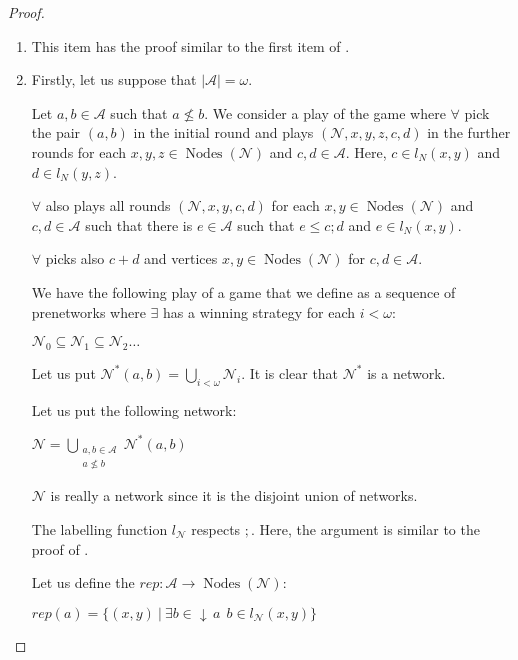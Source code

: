 \documentclass[a4paper]{article}
\theoremstyle{definition}
\theoremstyle{theorem}
\theoremstyle{proposition}
\theoremstyle{lemma}
\theoremstyle{ex}
\theoremstyle{corollary}
\theoremstyle{claim}
\newcommand{\down}[1]{\ensuremath{{\downarrow}\,#1}}
\begin{document}
\begin{proof}
$ $

  \begin{enumerate}
    \item This item has the proof similar to the first item of \cite[Proposition 5]{hirsch2005class}.

    \item
    Firstly, let us suppose that $|\mathcal{A}| = \omega$.

    Let $a, b \in \mathcal{A}$ such that $a \not\leq b$. We consider a play of the game where $\forall$ pick the pair $(a, b)$ in the initial round and plays $(\mathcal{N}, x, y, z, c, d)$ in the further rounds for each $x, y, z \in \operatorname{Nodes}(\mathcal{N})$ and $c,d \in \mathcal{A}$. Here, $c \in l_N(x, y)$ and $d \in l_N(y, z)$.

    $\forall$ also plays all rounds $(\mathcal{N},x,y,c,d)$ for each $x, y \in \operatorname{Nodes}(\mathcal{N})$ and $c,d \in \mathcal{A}$ such that there is $e \in \mathcal{A}$ such that
    $e \leq c ; d$ and $e \in l_N(x,y)$.

    $\forall$ picks also $c + d$ and vertices $x,y \in \operatorname{Nodes}(\mathcal{N})$ for $c, d \in \mathcal{A}$.

    We have the following play of a game that we define as a sequence of prenetworks where $\exists$ has a winning strategy for each $i < \omega$:

    \begin{center}
      $\mathcal{N}_0 \subseteq \mathcal{N}_1 \subseteq \mathcal{N}_2 \dots$
    \end{center}

    Let us put $\mathcal{N}^{*}(a, b) = \bigcup \limits_{i < \omega} \mathcal{N}_i$. It is clear that $\mathcal{N}^{*}$ is a network.

    Let us put the following network:

    \begin{center}
      $\mathcal{N} = \bigcup \limits_{\substack{a, b \in \mathcal{A} \\ a \not\leq b}} \mathcal{N}^{*}(a,b)$
    \end{center}

    $\mathcal{N}$ is really a network since it is the disjoint union of networks.

    The labelling function $l_{\mathcal{N}}$ respects $;$. Here, the argument is similar to the proof of \cite[Proposition 5]{hirsch2005class}.

    Let us define the $rep : \mathcal{A} \to \operatorname{Nodes}(\mathcal{N})$:
    \begin{center}
      $rep(a) = \{ (x, y) \: | \: \exists b \in \down{a} \:\: b \in l_{\mathcal{N}}(x, y)\}$
    \end{center}


\end{enumerate}
\end{proof}
\end{document}
